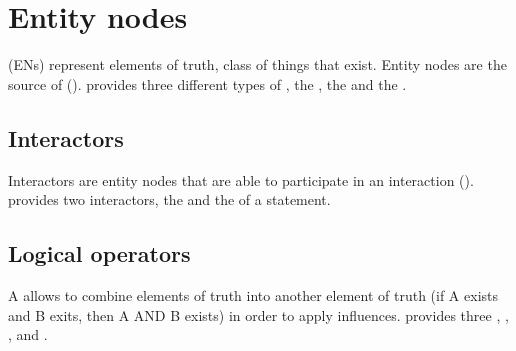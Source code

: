  
\section{Entity nodes}\label{sec:ENs}

 (ENs) represent elements of truth, class of things that exist. 
Entity nodes are the source of  (). \SBGNERLone{} provides three different types of , the , the  and the . 

\subsection{Interactors}\label{sec:interactors}

Interactors are entity nodes that are able to participate in an interaction (). \SBGNERLone{} provides two interactors, the  and the  of a statement.





\subsection{Logical operators}\label{sec:logic}

A  allows to combine elements of truth into another element of truth (if A exists and B exits, then A AND B exists) in order to apply influences. \SBGNERLone{} provides three , , , and . %

